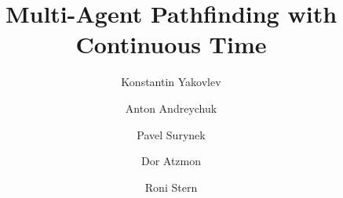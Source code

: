 \documentclass[review]{elsarticle}
\begin{document}
\begin{frontmatter}

\title{Multi-Agent Pathfinding with Continuous Time}








\author[ras,hse,mipt]{Konstantin Yakovlev}
\author[ras,rudn]{Anton Andreychuk}
\author[cvut]{Pavel Surynek}
\author[bgu]{Dor Atzmon}
\author[bgu,parc]{Roni Stern}

\address[ras]{Federal Research Center for Computer Science and Control of Russian Academy of Sciences, Russia}
\address[hse]{National Research University Higher School of Economics, Russia}
\address[mipt]{Moscow Institute of Physics and Technology, Russia}
\address[rudn]{Peoples' Friendship University of Russia (RUDN University), Russia}
\address[bgu]{Software and Information Systems Eng., 
Ben Gurion University of the Negev, Israel}
\address[parc]{System Sciences Laboratory (SSL), Palo Alto Research Center (PARC), USA}
\address[cvut]{Faculty of Information Technology (FIT), Czech Technical University (CVUT), Czech Republic}








\end{frontmatter}
\end{document}
